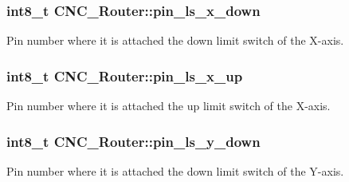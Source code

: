\hypertarget{class_c_n_c___router_a109a7c6e2a1e556e577f2ad09eefbef7}{
\subsubsection[{pin\+\_\+ls\+\_\+x\+\_\+down}]{\setlength{\rightskip}{0pt plus 5cm}int8\+\_\+t C\+N\+C\+\_\+\+Router\+::pin\+\_\+ls\+\_\+x\+\_\+down\hspace{0.3cm}{\ttfamily [private]}}}\label{class_c_n_c___router_a109a7c6e2a1e556e577f2ad09eefbef7}


Pin number where it is attached the down limit switch of the X-\/axis. 

\hypertarget{class_c_n_c___router_af935b225740dd189dcdcdca7664eb850}{
\subsubsection[{pin\+\_\+ls\+\_\+x\+\_\+up}]{\setlength{\rightskip}{0pt plus 5cm}int8\+\_\+t C\+N\+C\+\_\+\+Router\+::pin\+\_\+ls\+\_\+x\+\_\+up\hspace{0.3cm}{\ttfamily [private]}}}\label{class_c_n_c___router_af935b225740dd189dcdcdca7664eb850}


Pin number where it is attached the up limit switch of the X-\/axis. 

\hypertarget{class_c_n_c___router_a19cd8e9840fbfab991f9cab1300abe04}{
\subsubsection[{pin\+\_\+ls\+\_\+y\+\_\+down}]{\setlength{\rightskip}{0pt plus 5cm}int8\+\_\+t C\+N\+C\+\_\+\+Router\+::pin\+\_\+ls\+\_\+y\+\_\+down\hspace{0.3cm}{\ttfamily [private]}}}\label{class_c_n_c___router_a19cd8e9840fbfab991f9cab1300abe04}


Pin number where it is attached the down limit switch of the Y-\/axis. 

